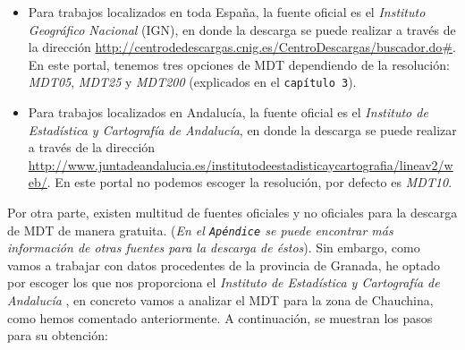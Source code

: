 \begin{itemize}
	\item Para trabajos localizados en toda España, la fuente oficial es el \textit{Instituto Geográfico Nacional} (IGN), en donde la descarga se puede realizar a través de la dirección \url{http://centrodedescargas.cnig.es/CentroDescargas/buscador.do#}. En este portal, tenemos tres opciones de MDT dependiendo de la resolución: \textit{MDT05}, \textit{MDT25} y \textit{MDT200} (explicados en el \texttt{capítulo 3}).
	\item Para trabajos localizados en Andalucía, la fuente oficial es el \textit{Instituto de Estadística y Cartografía de Andalucía}, en donde la descarga se puede realizar a través de la dirección \url{http://www.juntadeandalucia.es/institutodeestadisticaycartografia/lineav2/web/}. En este portal no podemos escoger la resolución, por defecto es \textit{MDT10}.
\end{itemize}

Por otra parte, existen multitud de fuentes oficiales y no oficiales para la descarga de MDT de manera gratuita. (\textit{En el \texttt{Apéndice} se puede encontrar más información de otras fuentes para la descarga de éstos}). Sin embargo, como vamos a trabajar con datos procedentes de la provincia de Granada, he optado por escoger los que nos proporciona el \textit{Instituto de Estadística y Cartografía de Andalucía} \cite{Instituto-Andalucia}, en concreto vamos a analizar el MDT para la zona de Chauchina, como hemos comentado anteriormente. A continuación, se muestran los pasos para su obtención:


